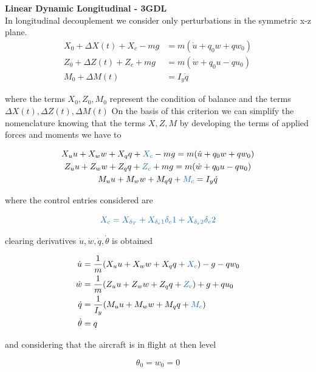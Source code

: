 \textbf{Linear Dynamic Longitudinal - 3GDL}\\
In longitudinal decouplement we consider only perturbations in the symmetric x-z plane.
\begin{align}
    X_0 + \Delta X(t) + X_c - mg &= m(\dot u + q_0 w + q w_0) \\
    Z_0 + \Delta Z(t) + Z_c + mg &= m ( \dot w + q_0 u - q u_0) \\
    M_0 + \Delta M(t) &= I_y \dot q
\end{align}

where the terms $X_0,Z_0, M_0$ represent the condition of balance and the terms $\Delta X(t),\Delta Z(t), \Delta M(t)$ On the basis of this criterion we can simplify the nomenclature knowing that the terms $X,Z,M$ by developing the terms of applied forces and moments we have to

\begin{gather}
    X_u u + X_w w + X_q q + \textcolor{RoyalBlue}{X_c} - mg = m(\dot u + q_0 w + q w_0) \\
    Z_u u + Z_w w + Z_q q + \textcolor{RoyalBlue}{Z_c} + mg = m ( \dot w + q_0 u - q u_0) \\
    M_u u + M_w w + M_q q + \textcolor{RoyalBlue}{M_c} = I_y \dot q
\end{gather}

where the control entries considered are

\begin{equation}
    \textcolor{RoyalBlue}{X_c = X_{\delta_{T}} + X_{\delta_e1} \delta_e1 + X_{\delta_e2} \delta_e2}
\end{equation}

clearing derivatives $\dot{u}, \dot{w},\dot{q},\dot{\theta}$ is obtained

\begin{align}
    \dot u &=\frac{1}{m}(X_u u + X_w w + X_q q + \textcolor{RoyalBlue}{X_c}) - g -q w_0  \\
    \dot w &= \frac{1}{m}(Z_u u + Z_w w + Z_q q + \textcolor{RoyalBlue}{Z_c}) + g + q u_0 \\
    \dot q &= \frac{1}{I_y}(M_u u + M_w w + M_q q + \textcolor{RoyalBlue}{M_c}) \\  
    \dot \theta &= q
\end{align}

and considering that the aircraft is in flight at then level

\begin{equation}
    \theta_{0} = w_0 = 0
\end{equation}

